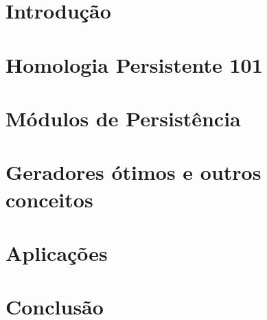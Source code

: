 \documentclass[mestrado, pre-defesa, draft]{packages/icmc}
\begin{document}
\textual

\chapter{Introdução}
\label{chapter:introducao}


\chapter{Homologia Persistente 101}
\label{chapter:hp101}


\chapter{Módulos de Persistência}
\label{chapter:mph}


\chapter{Geradores ótimos e outros conceitos}
\label{chapter:miscel}


\chapter{Aplicações}
\label{chapter:aplicacoes}


\chapter{Conclusão}
\label{chapter:conclusao}



%

\postextual



\end{document}
